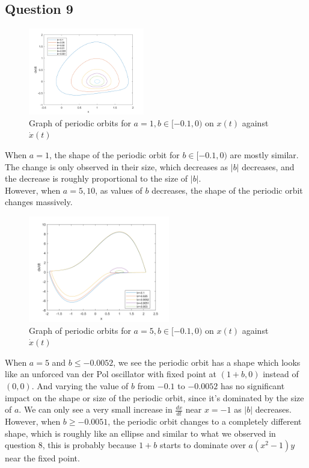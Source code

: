 \documentclass[10pt]{article}
\begin{document}
\subsection*{Question 9}
\begin{figure}[H]
\centering
\includegraphics[width=0.45\textwidth]{Files/q9,a=1.png}
\caption{Graph of periodic orbits for $a=1, b\in[-0.1,0)$ on $x(t)$ against $\dot{x}(t)$}
\end{figure}
When $a=1$, the shape of the periodic orbit for $b\in[-0.1,0)$ are mostly similar. The change is only observed in their size, which decreases as $|b|$ decreases, and the decrease is roughly proportional to the size of $|b|$.\\
However, when $a=5,10$, as values of $b$ decreases, the shape of the periodic orbit changes massively.\\
\begin{figure}[H]
\centering
\includegraphics[width=0.55\textwidth]{Files/q9,a=5.png}
\caption{Graph of periodic orbits for $a=5, b\in[-0.1,0)$ on $x(t)$ against $\dot{x}(t)$}
\end{figure}
\noindent When $a=5$ and $b\leq-0.0052$, we see the periodic orbit has a shape which looks like an unforced van der Pol oscillator with fixed point at $(1+b,0)$ instead of $(0,0)$. And varying the value of $b$ from $-0.1$ to $-0.0052$ has no significant impact on the shape or size of the periodic orbit, since it's dominated by the size of $a$. We can only see a very small increase in $\frac{dx}{dt}$ near $x=-1$ as $|b|$ decreases.\\
However, when $b\geq -0.0051$, the periodic orbit changes to a completely different shape, which is roughly like an ellipse and similar to what we observed in question 8, this is probably because $1+b$ starts to dominate over $a(x^2-1)y$ near the fixed point.
\end{document}
